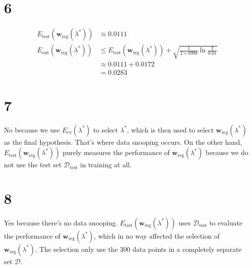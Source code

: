\documentclass{article}
\begin{document}
	\section*{6}
		\begin{align*}
			E_\text{test}(\mathbf w_\text{reg}(\lambda^*)) &\approx 0.0111\\
			E_\text{out}(\mathbf w_\text{reg}(\lambda^*)) &\leq E_\text{test}(\mathbf w_\text{reg}(\lambda^*)) + \sqrt{\frac1{2 \times 8998}\ln \frac2{0.01}}\\
			&\approx 0.0111 + 0.0172\\
			&= 0.0283
		\end{align*}
		
	\section*{7}
		No because we use $E_\text{cv}(\lambda^*)$ to select $\lambda^*$, which is then used to select $\mathbf w_\text{reg}(\lambda^*)$ as the final hypothesis. That's where data snooping occurs. On the other hand, $E_\text{test}(\mathbf w_\text{reg}(\lambda^*))$ purely measures the performance of $\mathbf w_\text{reg}(\lambda^*)$ because we do not use the test set $\mathcal D_\text{test}$ in training at all.
		
	\section*{8}
		Yes because there's no data snooping. $E_\text{test}(\mathbf w_\text{reg}(\lambda^*))$ uses $\mathcal D_\text{test}$ to evaluate the performance of $\mathbf w_\text{reg}(\lambda^*)$, which in no way affected the selection of $\mathbf w_\text{reg}(\lambda^*)$. The selection only use the 300 data points in a completely separate set $\mathcal D$.
		
\end{document}

